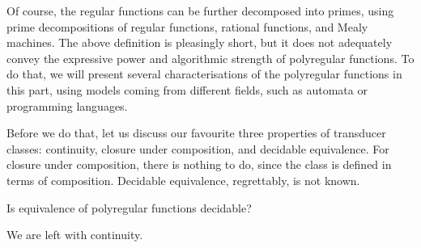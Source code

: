 Of course, the regular functions can be further decomposed into primes, using prime decompositions of regular functions, rational functions, and Mealy machines. The above definition is pleasingly short, but it does not adequately convey the expressive power and algorithmic strength of polyregular functions. To do that, we will present several characterisations of the polyregular functions in this part, using models coming from different fields, such as automata or programming languages.

Before we do that, let us discuss our favourite three properties of transducer classes: continuity, closure under composition, and decidable equivalence. For closure under composition, there is nothing to do, since the class is defined in terms of composition. 
Decidable equivalence, regrettably, is not known.
\begin{openproblem}\label{open:polyregular-equivalence}
    Is equivalence of polyregular functions decidable?
\end{openproblem}
We are left with continuity.

